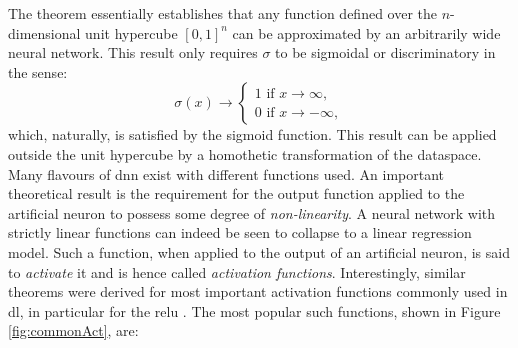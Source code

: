 The theorem essentially establishes that any function defined over the $n$-dimensional unit hypercube $[0, 1]^n$ can be approximated by an arbitrarily wide neural network. This result only requires $\sigma$ to be sigmoidal or discriminatory in the sense:
\begin{equation}
    \sigma(x) \rightarrow
    \begin{cases}
        1 \text{ if } x \rightarrow \infty,  \\
        0 \text{ if } x \rightarrow -\infty,
    \end{cases}
\end{equation}
which, naturally, is satisfied by the sigmoid function. This result can be applied outside the unit hypercube by a homothetic transformation of the dataspace. Many flavours of \gls{dnn} exist with different functions used. An important theoretical result is the requirement for the output function applied to the artificial neuron to possess some degree of \textit{non-linearity}. A neural network with strictly linear functions can indeed be seen to collapse to a linear regression model. Such a function, when applied to the output of an artificial neuron, is said to \textit{activate} it and is hence called \textit{activation functions}. Interestingly, similar theorems were derived for most important activation functions commonly used in \gls{dl}, in particular for the \gls{relu} \cite{universApproximator-Relu}. The most popular such functions, shown in Figure \ref{fig:commonAct}, are:
